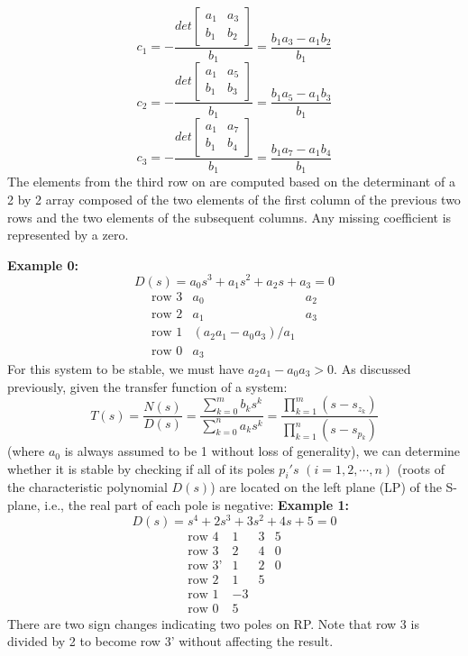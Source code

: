 \documentclass{beamer}
\begin{document}
\begin{frame}[allowframebreaks]
\medskip
\[ c_1=-\frac{det\left[\begin{array}{cc}a_1&a_3\\b_1&b_2\end{array}\right]}{b_1}
=\frac{b_1a_3-a_1b_2}{b_1} \]
\[ c_2=-\frac{det\left[\begin{array}{cc}a_1&a_5\\b_1&b_3\end{array}\right]}{b_1}
=\frac{b_1a_5-a_1b_3}{b_1} \]
\[ c_3=-\frac{det\left[\begin{array}{cc}a_1&a_7\\b_1&b_4\end{array}\right]}{b_1}
=\frac{b_1a_7-a_1b_4}{b_1} \]
\medskip
The elements from the third row on are computed based on the determinant of a
2 by 2 array composed of the two elements of the first column of the previous
two rows and the two elements of the subsequent columns. Any missing coefficient
is represented by a zero.

{\bf Example 0: }
\[ D(s)=a_0s^3+a_1s^2+a_2s+a_3=0 \]
\[ \begin{array}{rrr}
\mbox{row 3} & a_0 & a_2 \\
\mbox{row 2} & a_1 & a_3 \\
\mbox{row 1} & (a_2a_1-a_0a_3)/a_1 & \\
\mbox{row 0} & a_3 & 
\end{array} \]
\medskip
For this system to be stable, we must have $a_2a_1-a_0a_3>0$. 
As discussed previously, given the transfer function of a system:
\[
T(s)=\frac{N(s)}{D(s)}=\frac{\sum_{k=0}^m b_k s^k}{\sum_{k=0}^n a_k s^k}
=\frac{\prod_{k=1}^m (s-s_{z_k})}{\prod_{k=1}^n (s-s_{p_k})} 
\]
\medskip
(where $a_0$ is always assumed to be 1 without loss of generality), we 
can determine whether it is stable by checking if all of its poles $p_i's$
$(i=1,2,\cdots,n)$ (roots of the characteristic polynomial $D(s)$) are 
\medskip
located on the left plane (LP) of the S-plane, i.e., the real part of each
pole is negative:
\medskip
{\bf Example 1: }
\[ D(s)=s^4+2s^3+3s^2+4s+5=0 \]
\[ \begin{array}{rrrr}
\mbox{row 4}  & 1 & 3 & 5 \\
\mbox{row 3}  & 2 & 4 & 0 \\
\mbox{row 3'} & 1 & 2 & 0 \\
\mbox{row 2}  & 1 & 5 &   \\
\mbox{row 1}  & -3 &  &   \\
\mbox{row 0}  & 5  &  &   
\end{array} \]
\medskip
There are two sign changes indicating two poles on RP. Note that row 3 is divided
by 2 to become row 3' without affecting the result.
\end{frame}
\end{document}
